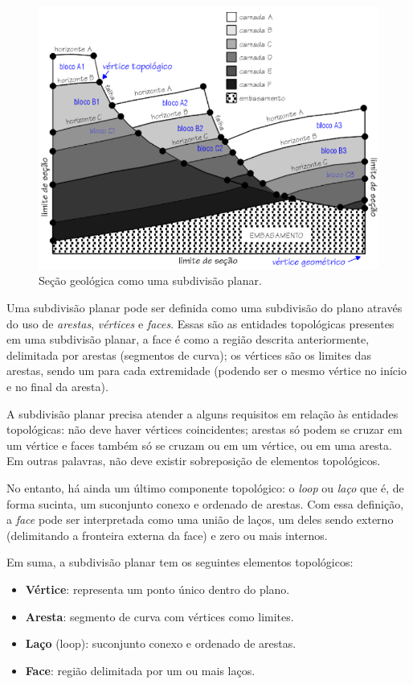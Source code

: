 \begin{figure} [h]
  \begin{center}
    \includegraphics[width=400pt]{images/fig-subdivisao-planar}
    \caption{Seção geológica como uma subdivisão planar.}\label{fig-subdivisao-planar}
  \end{center}
\end{figure}

Uma subdivisão planar pode ser definida como uma subdivisão do plano através do uso de \textit{arestas}, \textit{vértices} e \textit{faces}. Essas são as entidades topológicas presentes em uma subdivisão planar, a face é como a região descrita anteriormente, delimitada por arestas (segmentos de curva); os vértices são os limites das arestas, sendo um para cada extremidade (podendo ser o mesmo vértice no início e no final da aresta).

A subdivisão planar precisa atender a alguns requisitos em relação às entidades topológicas: não deve haver vértices coincidentes; arestas só podem se cruzar em um vértice e faces também só se cruzam ou em um vértice, ou em uma aresta. Em outras palavras, não deve existir sobreposição de elementos topológicos. 

No entanto, há ainda um último componente topológico: o \textit{loop} ou \textit{laço} que é, de forma sucinta, um suconjunto conexo e ordenado de arestas. Com essa definição, a \textit{face} pode ser interpretada como uma união de laços, um deles sendo externo (delimitando a fronteira externa da face) e zero ou mais internos.

Em suma, a subdivisão planar tem os seguintes elementos topológicos:
\renewcommand{\labelitemi}{•}
\begin{itemize}
  \item \textbf{Vértice}: representa um ponto único dentro do plano.
  \item \textbf{Aresta}: segmento de curva com vértices como limites.
  \item \textbf{Laço} (loop): suconjunto conexo e ordenado de arestas.
  \item \textbf{Face}: região delimitada por um ou mais laços.
\end{itemize}

